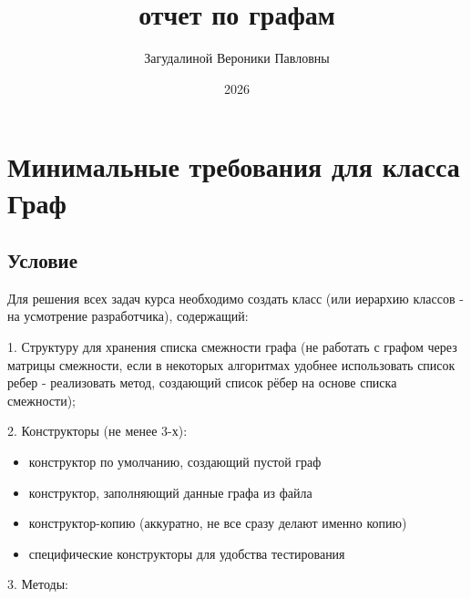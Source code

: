 \documentclass[referat]{SCWorks}
\begin{document}
    \studentfemale


    \title{отчет по графам}





    \author{Загудалиной Вероники Павловны}





    \date{2026}

    \maketitle

    \secNumbering

    \tableofcontents


    \section{Минимальные требования для класса Граф}

    \subsection{Условие}
    Для решения всех задач курса необходимо создать класс (или иерархию классов - на усмотрение разработчика), содержащий:

    1. Структуру для хранения списка смежности графа (не работать с графом через матрицы смежности, если в некоторых алгоритмах удобнее использовать список ребер - реализовать метод, создающий список рёбер на основе списка смежности);

    2. Конструкторы (не менее 3-х):



    \begin{itemize}
        \item конструктор по умолчанию, создающий пустой граф

        \item конструктор, заполняющий данные графа из файла

        \item конструктор-копию (аккуратно, не все сразу делают именно копию)

        \item специфические конструкторы для удобства тестирования
    \end{itemize}
    3. Методы:
\end{document}
